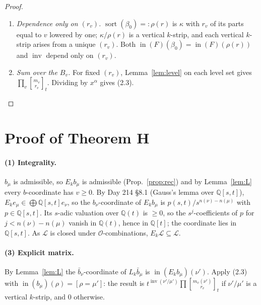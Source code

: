 \documentclass[11pt]{article}
\theoremstyle{definition}
\newcommand{\Q}{\mathbb{Q}}
\newcommand{\prodx}{\textstyle\prod^{\times}}
\newcommand{\sort}{\operatorname{sort}}
\newcommand{\inn}{\operatorname{in}}
\newcommand{\inv}{\operatorname{inv}}
\newcommand{\cO}{\mathcal{O}}
\newcommand{\cL}{\mathcal{L}}
\newcommand{\gbin}[3]{\genfrac{[}{]}{0pt}{}{#1}{#2}_{#3}}
\begin{document}
\begin{proof}
\begin{enumerate}[label=\arabic*.,resume]
\[\inn_0(\sigma_c\prodx_A)=t^{\#\{i\in A,\,j\notin A:\,\alpha_i<\alpha_j\}}\prod_v\prod_{i\in B_v,\,j\in L_v\setminus B_v}a_{ij},\]
and the $t$-exponent is $\sum_{v<w}r_v(m_w-r_w)=\inv$.
\item \emph{Dependence only on $(r_v)$.} $\sort(\beta_0)=:\rho(r)$ is $\kappa$ with $r_v$ of its parts equal to $v$ lowered by one; $\kappa/\rho(r)$ is a vertical $k$-strip, and each vertical $k$-strip arises from a unique $(r_v)$. Both $\inn(F)(\beta_0)=\inn(F)(\rho(r))$ and $\inv$ depend only on $(r_v)$.
\item \emph{Sum over the $B_v$.} For fixed $(r_v)$, Lemma~\ref{lem:level} on each level set gives $\prod_v\gbin{m_v}{r_v}t$. Dividing by $x^\alpha$ gives (2.3).\qedhere
\end{enumerate}
\end{proof}

\section{Proof of Theorem H}

\paragraph{(1) Integrality.} $b_\mu$ is admissible, so $E_kb_\mu$ is admissible (Prop.~\ref{prop:rec}) and by Lemma~\ref{lem:L} every $b$-coordinate has $v\ge0$. By Day 214 \S8.1 (Gauss's lemma over $\Q[s,t]$), $E_ke_\mu\in\bigoplus\Q[s,t]e_\nu$, so the $b_\nu$-coordinate of $E_kb_\mu$ is $p(s,t)/s^{n(\nu)-n(\mu)}$ with $p\in\Q[s,t]$. Its $s$-adic valuation over $\Q(t)$ is $\ge0$, so the $s^j$-coefficients of $p$ for $j<n(\nu)-n(\mu)$ vanish in $\Q(t)$, hence in $\Q[t]$; the coordinate lies in $\Q[s,t]$. As $\cL$ is closed under $\cO$-combinations, $E_k\cL\subseteq\cL$.

\paragraph{(3) Explicit matrix.} By Lemma~\ref{lem:L} the $\bar b_\nu$-coordinate of $L_k\bar b_\mu$ is $\inn(E_kb_\mu)(\nu')$. Apply (2.3) with $\inn(b_\mu)(\rho)=[\rho=\mu']$: the result is $t^{\inv(\nu'/\mu')}\prod\gbin{m_v(\nu')}{r_v}t$ if $\nu'/\mu'$ is a vertical $k$-strip, and $0$ otherwise.
\end{document}

